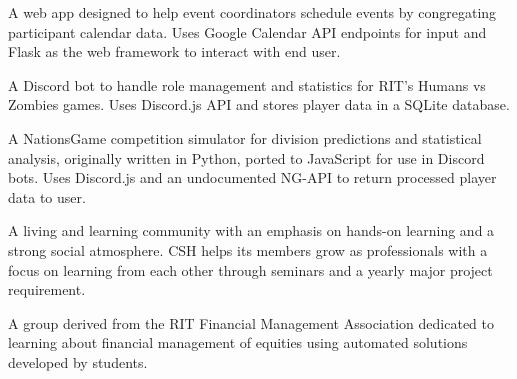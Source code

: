 \documentclass[10pt,a4paper,ragged2e,withhyper]{altacv}
\begin{document}
\begin{paracol}{2}


A web app designed to help event coordinators schedule events by congregating participant calendar data.  Uses Google Calendar API endpoints for input and Flask as the web framework to interact with end user.\par\vspace{.15cm}

\divider

A Discord bot to handle role management and statistics for RIT's Humans vs  Zombies games.  Uses Discord.js API and stores player data in a SQLite database.\par\vspace{.15cm}

\divider

A NationsGame competition simulator for division predictions and statistical analysis, originally written in Python, ported to JavaScript for use in Discord bots.  Uses Discord.js and an undocumented NG-API to return processed player data to user.\par\vspace{.15cm}


\medskip


A living and learning community with an emphasis on hands-on learning and a strong social atmosphere. CSH helps its members grow as professionals with a focus on learning from each other through seminars and a yearly major project requirement.

\divider

A group derived from the RIT Financial Management Association dedicated to learning about financial management of equities using automated solutions developed by students.


\end{paracol}
\end{document}
